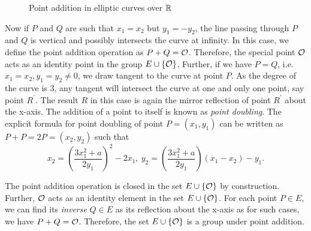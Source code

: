 \begin{figure}[h!]
\begin{center}
    \end{center}
    \caption{Point addition in elliptic curves over $\mathbb{R}$}
    \label{fig:point_add}
\end{figure}

Now if $P$ and $Q$ are such that $x_1 = x_2$ but $y_1 = -y_2$, the line passing through $P$ and $Q$ is vertical and possibly intersects the curve at infinity.
In this case, we define the point addition operation as $P + Q = \mathcal{O}$.
Therefore, the special point $\mathcal{O}$ acts as an identity point in the group $E \cup \{\mathcal{O}\}$.
Further, if we have $P=Q$, i.e. $x_1 = x_2, y_1 = y_2 \neq 0$, we draw tangent to the curve at point $P$.
As the degree of the curve is 3, any tangent will intersect the curve at one and only one point, say point $R^{\prime}$.
The result $R$ in this case is again the mirror reflection of point $R^{\prime}$ about the x-axis. 
The addition of a point to itself is known as \textit{point doubling}. 
The explicit formula for point doubling of point $P=(x_1,y_1)$ can be written as $P+P = 2P = (x_2, y_2)$ such that
\begin{equation}
    x_2 = \left( \frac{3x_1^2 + a}{2y_1} \right)^2 - 2x_1, \ y_2 = \left( \frac{3x_1^2 + a}{2y_1} \right)(x_1-x_2) - y_1.
    \label{eqn:point_double}
\end{equation}

The point addition operation is closed in the set $E \cup \{\mathcal{O}\}$ by construction. 
Further, $\mathcal{O}$ acts as an identity element in the set $E \cup \{\mathcal{O}\}$.
For each point $P \in E$, we can find its \textit{inverse} $Q \in E$ as its reflection about the x-axis as for such cases, we have $P+Q = \mathcal{O}$.
Therefore, the set $E \cup \{\mathcal{O}\}$ is a group under point addition.

